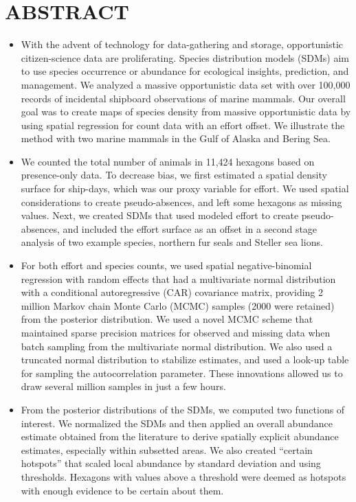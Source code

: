 \documentclass[11pt, titlepage]{article}
\begin{document}
\section*{ABSTRACT}
\thispagestyle{empty}
\begin{onehalfspace}
\begin{itemize}
    \item With the advent of technology for data-gathering and storage, opportunistic citizen-science data are proliferating. Species distribution models (SDMs) aim to use species occurrence or abundance for ecological insights, prediction, and management. We analyzed a massive opportunistic data set with over 100,000 records of incidental shipboard observations of marine mammals. Our overall goal was to create maps of species density from massive opportunistic data by using spatial regression for count data with an effort offset. We illustrate the method with two marine mammals in the Gulf of Alaska and Bering Sea.  
    \item We counted the total number of animals in 11,424 hexagons based on presence-only data. To decrease bias, we first estimated a spatial density surface for ship-days, which was our proxy variable for effort.  We used spatial considerations to create pseudo-absences, and left some hexagons as missing values. Next, we created SDMs that used modeled effort to create pseudo-absences, and included the effort surface as an offset in a second stage analysis of two example species, northern fur seals and Steller sea lions.
    \item For both effort and species counts, we used spatial negative-binomial regression with random effects that had a multivariate normal distribution with a conditional autoregressive (CAR) covariance matrix, providing 2 million Markov chain Monte Carlo (MCMC) samples (2000 were retained) from the posterior distribution. We used a novel MCMC scheme that maintained sparse precision matrices for observed and missing data when batch sampling from the multivariate normal distribution. We also used a truncated normal distribution to stabilize estimates, and used a look-up table for sampling the autocorrelation parameter.  These innovations allowed us to draw several million samples in just a few hours. 
    \item From the posterior distributions of the SDMs, we computed two functions of interest.  We normalized the SDMs and then applied an overall abundance estimate obtained from the literature to derive spatially explicit abundance estimates, especially within subsetted areas.  We also created ``certain hotspots'' that scaled local abundance by standard deviation and using thresholds.  Hexagons with values above a threshold were deemed as hotspots with enough evidence to be certain about them.
\end{itemize}
\end{onehalfspace}
\hrulefill \\
\end{document}
